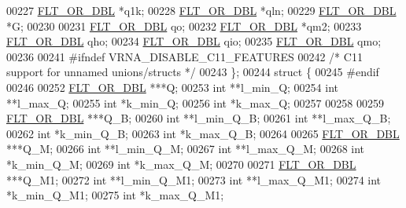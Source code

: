 \begin{DoxyCode}
00227       \hyperlink{group__data__structures_ga31125aeace516926bf7f251f759b6126}{FLT\_OR\_DBL}  *q1k;
00228       \hyperlink{group__data__structures_ga31125aeace516926bf7f251f759b6126}{FLT\_OR\_DBL}  *qln;
00229       \hyperlink{group__data__structures_ga31125aeace516926bf7f251f759b6126}{FLT\_OR\_DBL}  *G;
00230 
00231       \hyperlink{group__data__structures_ga31125aeace516926bf7f251f759b6126}{FLT\_OR\_DBL}  qo;
00232       \hyperlink{group__data__structures_ga31125aeace516926bf7f251f759b6126}{FLT\_OR\_DBL}  *qm2;
00233       \hyperlink{group__data__structures_ga31125aeace516926bf7f251f759b6126}{FLT\_OR\_DBL}  qho;
00234       \hyperlink{group__data__structures_ga31125aeace516926bf7f251f759b6126}{FLT\_OR\_DBL}  qio;
00235       \hyperlink{group__data__structures_ga31125aeace516926bf7f251f759b6126}{FLT\_OR\_DBL}  qmo;
00236 
00241 \textcolor{preprocessor}{#ifndef VRNA\_DISABLE\_C11\_FEATURES}
00242     \textcolor{comment}{/* C11 support for unnamed unions/structs */}
00243     \};
00244     \textcolor{keyword}{struct }\{
00245 \textcolor{preprocessor}{#endif}
00246 
00252       \hyperlink{group__data__structures_ga31125aeace516926bf7f251f759b6126}{FLT\_OR\_DBL}      ***Q;
00253       \textcolor{keywordtype}{int}             **l\_min\_Q;
00254       \textcolor{keywordtype}{int}             **l\_max\_Q;
00255       \textcolor{keywordtype}{int}             *k\_min\_Q;
00256       \textcolor{keywordtype}{int}             *k\_max\_Q;
00257 
00258 
00259       \hyperlink{group__data__structures_ga31125aeace516926bf7f251f759b6126}{FLT\_OR\_DBL}      ***Q\_B;
00260       \textcolor{keywordtype}{int}             **l\_min\_Q\_B;
00261       \textcolor{keywordtype}{int}             **l\_max\_Q\_B;
00262       \textcolor{keywordtype}{int}             *k\_min\_Q\_B;
00263       \textcolor{keywordtype}{int}             *k\_max\_Q\_B;
00264 
00265       \hyperlink{group__data__structures_ga31125aeace516926bf7f251f759b6126}{FLT\_OR\_DBL}      ***Q\_M;
00266       \textcolor{keywordtype}{int}             **l\_min\_Q\_M;
00267       \textcolor{keywordtype}{int}             **l\_max\_Q\_M;
00268       \textcolor{keywordtype}{int}             *k\_min\_Q\_M;
00269       \textcolor{keywordtype}{int}             *k\_max\_Q\_M;
00270 
00271       \hyperlink{group__data__structures_ga31125aeace516926bf7f251f759b6126}{FLT\_OR\_DBL}      ***Q\_M1;
00272       \textcolor{keywordtype}{int}             **l\_min\_Q\_M1;
00273       \textcolor{keywordtype}{int}             **l\_max\_Q\_M1;
00274       \textcolor{keywordtype}{int}             *k\_min\_Q\_M1;
00275       \textcolor{keywordtype}{int}             *k\_max\_Q\_M1;

\end{DoxyCode}
